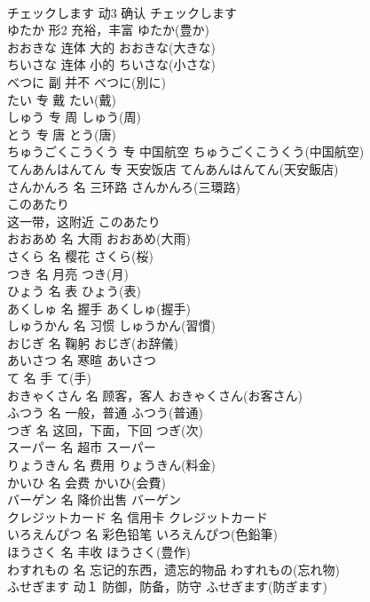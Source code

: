 \documentclass[8pt]{extreport}
\begin{document}
\begin{CJK}{UTF8}{min}
\\	チェックします	动3	确认	チェックします	
\\	ゆたか	形2	充裕，丰富	ゆたか(豊か)	
\\	おおきな	连体	大的	おおきな(大きな)	
\\	ちいさな	连体	小的	ちいさな(小さな)	
\\	べつに	副	并不	べつに(別に)	
\\	たい	专	戴	たい(戴)	
\\	しゅう	专	周	しゅう(周)	
\\	とう	专	唐	とう(唐)	
\\	ちゅうごくこうくう	专	中国航空	ちゅうごくこうくう(中国航空)	
\\	てんあんはんてん	专	天安饭店	てんあんはんてん(天安飯店)	
\\	さんかんろ	名	三环路	さんかんろ(三環路)	
\\	このあたり	
\\	这一带，这附近	このあたり	
\\	おおあめ	名	大雨	おおあめ(大雨)	
\\	さくら	名	樱花	さくら(桜)	
\\	つき	名	月亮	つき(月)	
\\	ひょう	名	表	ひょう(表)	
\\	あくしゅ	名	握手	あくしゅ(握手)	
\\	しゅうかん	名	习惯	しゅうかん(習慣)	
\\	おじぎ	名	鞠躬	おじぎ(お辞儀)	
\\	あいさつ	名	寒暄	あいさつ	
\\	て	名	手	て(手)	
\\	おきゃくさん	名	顾客，客人	おきゃくさん(お客さん)	
\\	ふつう	名	一般，普通	ふつう(普通)	
\\	つぎ	名	这回，下面，下回	つぎ(次)	
\\	スーパー	名	超市	スーパー	
\\	りょうきん	名	费用	りょうきん(料金)	
\\	かいひ	名	会费	かいひ(会費)	
\\	バーゲン	名	降价出售	バーゲン	
\\	クレジットカード	名	信用卡	クレジットカード	
\\	いろえんぴつ	名	彩色铅笔	いろえんぴつ(色鉛筆)	
\\	ほうさく	名	丰收	ほうさく(豊作)	
\\	わすれもの	名	忘记的东西，遗忘的物品	わすれもの(忘れ物)	
\\	ふせぎます	动１	防御，防备，防守	ふせぎます(防ぎます)	

\end{CJK}
\end{document}
